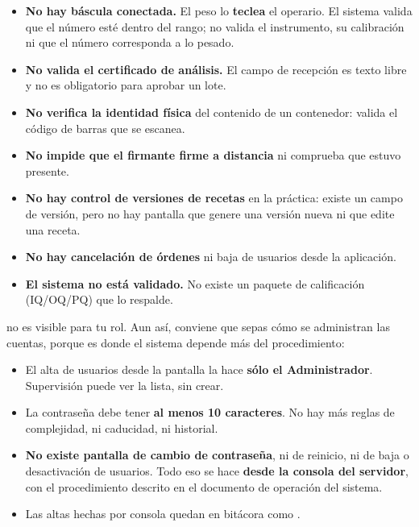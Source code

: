\begin{cajaOjo}
\begin{itemize}
    \item \textbf{No hay báscula conectada.} El peso lo \textbf{teclea} el operario.
          El sistema valida que el número esté dentro del rango; no valida el
          instrumento, su calibración ni que el número corresponda a lo pesado.
    \item \textbf{No valida el certificado de análisis.} El campo de recepción es texto
          libre y no es obligatorio para aprobar un lote.
    \item \textbf{No verifica la identidad física} del contenido de un contenedor: valida
          el código de barras que se escanea.
    \item \textbf{No impide que el firmante firme a distancia} ni comprueba que estuvo
          presente.
    \item \textbf{No hay control de versiones de recetas} en la práctica: existe un campo
          de versión, pero no hay pantalla que genere una versión nueva ni que edite una receta.
    \item \textbf{No hay cancelación de órdenes} ni baja de usuarios desde la aplicación.
    \item \textbf{El sistema no está validado.} No existe un paquete de calificación
          (IQ/OQ/PQ) que lo respalde.
\end{itemize}
\end{cajaOjo}

\newpage
{}

 no es visible para tu rol. Aun así, conviene que sepas cómo se
administran las cuentas, porque es donde el sistema depende más del procedimiento:

\begin{itemize}
    \item El alta de usuarios desde la pantalla la hace \textbf{sólo el Administrador}.
          Supervisión puede ver la lista, sin crear.
    \item La contraseña debe tener \textbf{al menos 10 caracteres}. No hay más reglas de
          complejidad, ni caducidad, ni historial.
    \item \textbf{No existe pantalla de cambio de contraseña}, ni de reinicio, ni de baja
          o desactivación de usuarios. Todo eso se hace \textbf{desde la consola del
          servidor}, con el procedimiento descrito en el documento de operación del sistema.
    \item Las altas hechas por consola quedan en bitácora como
          .
\end{itemize}

